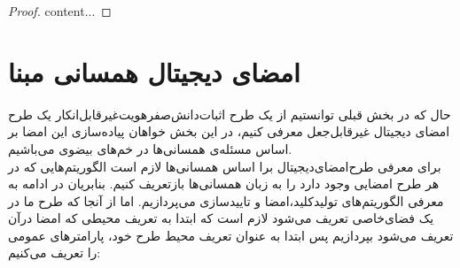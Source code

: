 \begin{proof}
	content...
\end{proof}


\newpage
\section{امضای دیجیتال همسانی مبنا}\label{isogeny_ds}
حال که در بخش قبلی توانستیم از یک طرح اثبات‌دانش‌صفر‌هویت‌غیرقابل‌انکار یک طرح امضای دیجیتال  غیرقابل‌جعل معرفی کنیم، در این بخش خواهان پیاده‌سازی این امضا بر اساس مسئله‌ی همسانی‌ها در خم‌های بیضوی می‌باشیم.
\\
برای معرفی طرح‌امضای‌دیجیتال برا اساس همسانی‌ها لازم است الگوریتم‌هایی که در هر طرح امضایی وجود دارد را به زبان همسانی‌ها بازتعریف کنیم. بنابریان در ادامه به معرفی الگوریتم‌های تولید‌کلید،امضا و تاییدسازی می‌پردازیم. اما از آنجا که طرح ما در یک فضای‌خاصی تعریف می‌شود لازم است که ابتدا به تعریف محیطی که امضا درآن تعریف می‌شود بپردازیم پس ابتدا به عنوان تعریف محیط طرح خود، پارامترهای عمومی را تعریف می‌کنیم:
\\ 
